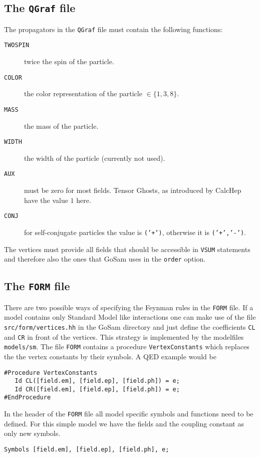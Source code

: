 \documentclass[11pt,a4paper]{refrep}
\newcommand{\gosamversion}{{3{.}0}}
\newcommand{\gosamv}[1][\gosamversion]{{\sc GoSam}\xspace}
\newcommand{\qgraf}{{\tt QGraf}\xspace}
\newcommand{\form}{{\tt FORM}\xspace}
\begin{document}
\subsection{The \qgraf{} file}
The propagators in the \qgraf{} file must contain the following functions:
\begin{description}
\item[\texttt{TWOSPIN}] twice the spin of the particle.
\item[\texttt{COLOR}]   the color representation of the particle $\in\{1,3,8\}$.
\item[\texttt{MASS}]    the mass of the particle.
\item[\texttt{WIDTH}]   the width of the particle (currently not used).
\item[\texttt{AUX}]     must be zero for most fields. Tensor Ghosts, as introduced
                        by CalcHep have the value $1$ here.
\item[\texttt{CONJ}]    for self-conjugate particles the value is \texttt{('+')},
                        otherwise it is \texttt{('+','-')}.
\end{description}

The vertices must provide all fields that should be accessible in \texttt{VSUM} statements
and therefore also the ones that \gosamv{} uses in the \texttt{order} option.

\subsection{The \form{} file}
There are two possible ways of specifying the Feynman rules in the \form{} file.
If a model contains only Standard Model like interactions one can make use of
the file \texttt{src/form/vertices.hh} in the \gosamv{} directory and just define
the coefficients \texttt{CL} and \texttt{CR} in front of the vertices. This
strategy is implemented by the modelfiles \texttt{models/sm}. The file
\form{} contains a procedure \texttt{VertexConstants} which
replaces the the vertex constants by their symbols. A QED example would be
\begin{lstlisting}[language=form]
#Procedure VertexConstants
   Id CL([field.em], [field.ep], [field.ph]) = e;
   Id CR([field.em], [field.ep], [field.ph]) = e;
#EndProcedure
\end{lstlisting}
In the header of the \form{} file all model specific
symbols and functions need to be defined. For this simple
model we have the fields and the coupling constant as only
new symbols.
\begin{lstlisting}[language=form]
Symbols [field.em], [field.ep], [field.ph], e;
\end{lstlisting}
\end{document}

